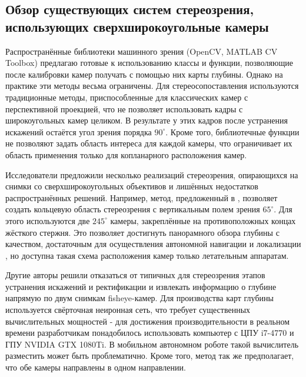 


\subsection{Обзор существующих систем стереозрения, использующих сверхширокоугольные камеры}

Распространённые библиотеки машинного зрения (OpenCV, MATLAB CV Toolbox) предлагаю готовые к использованию классы и функции, позволяющие после калибровки
камер получать с помощью них карты глубины. Однако на практике эти методы весьма ограничены. Для стереосопоставления 
используются традиционные методы, приспособленные для классических камер с перспективной проекцией, что не позволяет 
использовать кадры с широкоугольных камер целиком. В результате у этих кадров после устранения искажений остаётся 
угол зрения порядка $90^\circ$. Кроме того, библиотечные функции не позволяют задать область интереса для каждой камеры, 
что ограничивает их область применения только для копланарного расположения камер.   %

Исследователи предложили несколько реализаций стереозрения, опирающихся на снимки со сверхширокоугольных 
объективов и лишённых недостатков распространённых решений.  
Например, метод, предложенный в \cite{omni_stereo}, позволяет создать кольцевую область стереозрения с вертикальным  %
полем зрения $65^\circ$. Для этого используются две $245^\circ$ камеры, закреплённые на противоположных концах жёсткого стержня.  
Это позволяет достигнуть панорамного обзора глубины с качеством, достаточным для осуществления автономной навигации и
локализации \cite{omni_copter}, но доступна такая схема расположения камер только летательным аппаратам.  

Другие авторы \cite{direct_neuro_stereo} решили отказаться от типичных для стереозрения этапов устранения искажений и ректификации %
и извлекать информацию о глубине напрямую по двум снимкам fisheye-камер. Для производства карт глубины используется 
свёрточная неиронная сеть, что требует существенных вычислительных мощностей - для достижения производительности в реальном 
времени разработчикам понадобилось использовать компьютер с ЦПУ i7-4770 и ГПУ NVIDIA GTX 1080Ti. В мобильном автономном роботе
такой вычислитель разместить может быть проблематично. Кроме того, метод так же предполагает, что обе камеры направлены в одном 
направлении. 


 